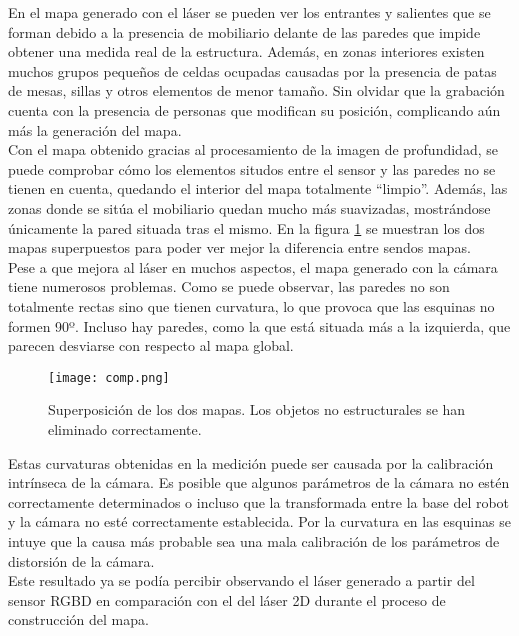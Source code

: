 En el mapa generado con el láser se pueden ver los entrantes y salientes que se forman debido a la presencia de mobiliario delante de las paredes que impide obtener una medida real de la estructura. Además, en zonas interiores existen muchos grupos pequeños de celdas ocupadas causadas por la presencia de patas de mesas, sillas y otros elementos de menor tamaño. Sin olvidar que la grabación cuenta con la presencia de personas que modifican su posición, complicando aún más la generación del mapa.\\

Con el mapa obtenido gracias al procesamiento de la imagen de profundidad, se puede comprobar cómo los elementos situdos entre el sensor y las paredes no se tienen en cuenta, quedando el interior del mapa totalmente ``limpio''. Además, las zonas donde se sitúa el mobiliario quedan mucho más suavizadas, mostrándose únicamente la pared situada tras el mismo. En la figura \ref{fig:comp} se muestran los dos mapas superpuestos para poder ver mejor la diferencia entre sendos mapas.\\

Pese a que mejora al láser en muchos aspectos, el mapa generado con la cámara tiene numerosos problemas. Como se puede observar, las paredes no son totalmente rectas sino que tienen curvatura, lo que provoca que las esquinas no formen 90º. Incluso hay paredes, como la que está situada más a la izquierda, que parecen desviarse con respecto al mapa global.\\

\begin{figure}[h]
	\begin{center} 
		\texttt{[image: comp.png]}
	\end{center}
	\caption{Superposición de los dos mapas. Los objetos no estructurales se han eliminado correctamente.}
	\label{fig:comp}
\end{figure}

Estas curvaturas obtenidas en la medición puede ser causada por la calibración intrínseca de la cámara. Es posible que algunos parámetros de la cámara no estén correctamente determinados o incluso que la transformada entre la base del robot y la cámara no esté correctamente establecida. Por la curvatura en las esquinas se intuye que la causa más probable sea una mala calibración de los parámetros de distorsión de la cámara.\\

Este resultado ya se podía percibir observando el láser generado a partir del sensor RGBD en comparación con el del láser 2D durante el proceso de construcción del mapa.\\

